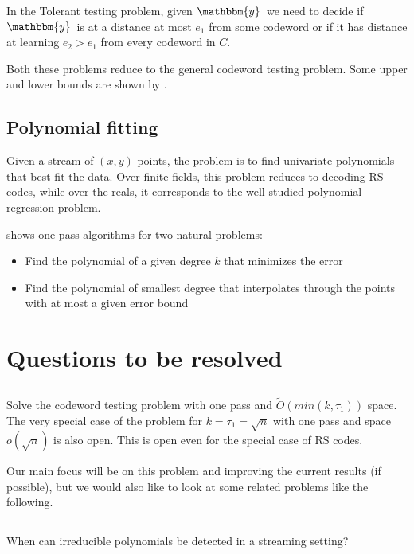 \documentclass{article}
\newcommand{\y}{\ensuremath{\mathbbm{y}}}
\begin{document}
In the Tolerant testing problem, given \y\ we need to decide
if \y\ is at a distance at most $e_1$ from some codeword or
if it has distance at learning $e_2 > e_1$ from every codeword in $C$.

Both these problems reduce to the general codeword testing problem.
Some upper and lower bounds are shown by \citeauthor*{rudra2010data}\cite{rudra2010data}.

\subsection{Polynomial fitting}
Given a stream of $(x,y)$ points, the problem is to find univariate polynomials that
best fit the data. Over finite fields, this problem reduces to decoding RS codes,
while over the reals, it corresponds to the well studied polynomial regression problem.

\citeauthor*{mcgregor2011polynomial}\cite{mcgregor2011polynomial} shows one-pass algorithms for two natural problems:
\begin{itemize}
\item Find the polynomial of a given degree $k$ that minimizes the error
\item Find the polynomial of smallest degree that interpolates through the points with at most a given error bound
\end{itemize}

\section{Questions to be resolved}
\label{sec:problems}

\subsection{}
Solve the codeword testing problem with one pass and $\tilde{O}(min(k,\tau_1))$ space.
The very special case of the problem for $k = \tau_1 = \sqrt{n}$ with one pass and space $o(\sqrt{n})$ is also open.
This is open even for the special case of RS codes\cite{sublinear}.

Our main focus will be on this problem and improving the current results (if possible),
but we would also like to look at some related problems like the following.

\subsection{}
When can irreducible polynomials be detected in a streaming setting?\cite{uurtamo-proposal}
\end{document}
